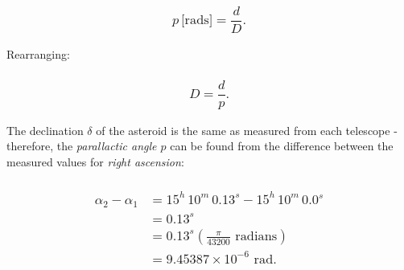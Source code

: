 \documentclass[
]{article}
\begin{document}
\hypertarget{plbracktextradsrbrack-fracdd.}{%
\subsubsection{\texorpdfstring{{\[p\,\lbrack\text{rads}\rbrack = \frac{d}{D}.\]}}{p\textbackslash,\textbackslash lbrack\textbackslash text\{rads\}\textbackslash rbrack = \textbackslash frac\{d\}\{D\}.}}\label{plbracktextradsrbrack-fracdd.}}

Rearranging:

\hypertarget{d-fracdp.}{%
\subsubsection{\texorpdfstring{{\[D = \frac{d}{p}.\]}}{D = \textbackslash frac\{d\}\{p\}.}}\label{d-fracdp.}}

The declination {\(\delta\)} of the asteroid is the same as measured
from each telescope - therefore, the \emph{parallactic angle {\(p\)}}
can be found from the difference between the measured values for
\emph{right ascension}:

\hypertarget{beginmatrix-alpha_2---alpha_1-15h-10m-0.13s---15h-10m-0.0s-0.13s-0.13sleft-fracpi43200textradians-right-9.45387-times-10--6textrad.-endmatrix}{%
\subsubsection{\texorpdfstring{{\[\begin{matrix}
{\alpha_{2} - \alpha_{1}} & {= 15^{h}\, 10^{m}\, 0.13^{s} - 15^{h}\, 10^{m}\, 0.0^{s}} \\
 & {= 0.13^{s}} \\
 & {= 0.13^{s}\left( \frac{\pi}{43200}\text{~radians} \right)} \\
 & {= 9.45387 \times 10^{- 6}\text{~rad}.} \\
\end{matrix}\]}}{\textbackslash begin\{matrix\}
\{\textbackslash alpha\_\{2\} - \textbackslash alpha\_\{1\}\} \& \{= 15\^{}\{h\}\textbackslash, 10\^{}\{m\}\textbackslash, 0.13\^{}\{s\} - 15\^{}\{h\}\textbackslash, 10\^{}\{m\}\textbackslash, 0.0\^{}\{s\}\} \textbackslash\textbackslash{}
 \& \{= 0.13\^{}\{s\}\} \textbackslash\textbackslash{}
 \& \{= 0.13\^{}\{s\}\textbackslash left( \textbackslash frac\{\textbackslash pi\}\{43200\}\textbackslash text\{\textasciitilde radians\} \textbackslash right)\} \textbackslash\textbackslash{}
 \& \{= 9.45387 \textbackslash times 10\^{}\{- 6\}\textbackslash text\{\textasciitilde rad\}.\} \textbackslash\textbackslash{}
\textbackslash end\{matrix\}}}\label{beginmatrix-alpha_2---alpha_1-15h-10m-0.13s---15h-10m-0.0s-0.13s-0.13sleft-fracpi43200textradians-right-9.45387-times-10--6textrad.-endmatrix}}
\end{document}
